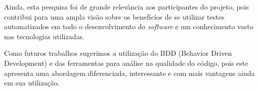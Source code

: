 \par Ainda, esta pesquisa foi de grande relevância aos participantes do projeto, pois contribui para uma ampla visão sobre os benefícios de se utilizar testes automatizados em todo o desenvolvimento do \textit{software} e um conhecimento vasto nas tecnologias utilizadas.

\par Como futuros trabalhos sugerimos a utilização do BDD (Behavior Driven Development) e das ferramentas para análise na qualidade do código, pois este apresenta uma abordagem diferenciada, interessante e com mais vantagens ainda em sua utilização.

